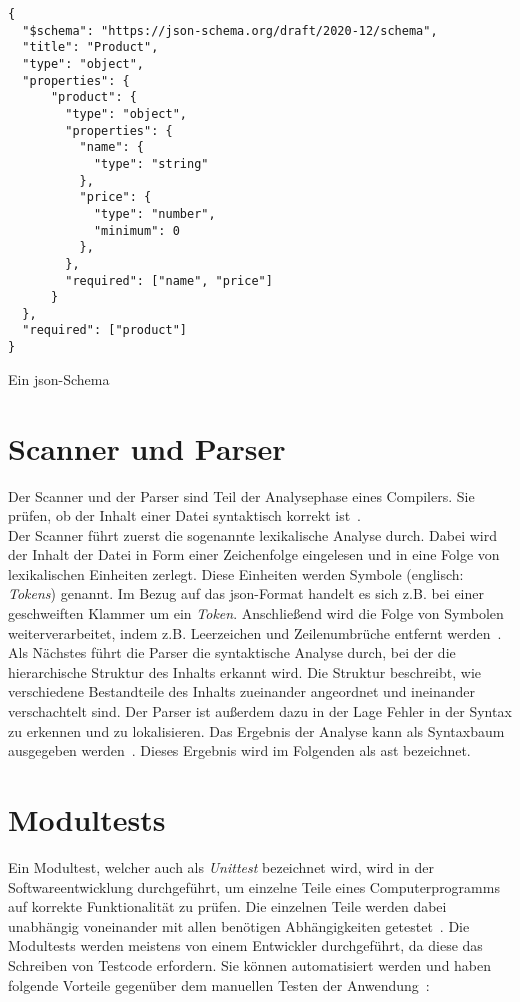 \begin{listing}[htp]
    \begin{verbatim}
{
  "$schema": "https://json-schema.org/draft/2020-12/schema",
  "title": "Product",
  "type": "object",
  "properties": {
      "product": {
        "type": "object",
        "properties": {
          "name": {
            "type": "string"
          },
          "price": {
            "type": "number", 
            "minimum": 0
          },
        },
        "required": ["name", "price"]
      }
  },
  "required": ["product"]
}
      \end{verbatim}
    \caption{Ein \acs{json}-Schema}
    \label{lst:json-schema}
\end{listing}

\section{Scanner und Parser}\label{sec:parser}

Der Scanner und der Parser sind Teil der Analysephase eines Compilers. Sie prüfen, ob der Inhalt einer Datei syntaktisch korrekt ist~\cite{SommerGumm+2019+113+148}.
\\
Der Scanner führt zuerst die sogenannte lexikalische Analyse durch. Dabei wird der Inhalt der Datei in Form einer
Zeichenfolge eingelesen und in eine Folge von lexikalischen Einheiten zerlegt.
Diese Einheiten werden Symbole (englisch: \textit{Tokens}) genannt.
Im Bezug auf das \ac{json}-Format handelt es sich z.B. bei einer geschweiften Klammer um ein \textit{Token}.
Anschließend wird die Folge von Symbolen weiterverarbeitet, indem z.B. Leerzeichen und Zeilenumbrüche entfernt werden~\cite{syntax-analysis}.
\\
Als Nächstes führt die Parser die syntaktische Analyse durch, bei der die hierarchische Struktur des Inhalts erkannt wird.
Die Struktur beschreibt, wie verschiedene Bestandteile des Inhalts zueinander angeordnet und ineinander verschachtelt sind.
Der Parser ist außerdem dazu in der Lage Fehler in der Syntax zu erkennen und zu lokalisieren.
Das Ergebnis der Analyse kann als Syntaxbaum ausgegeben werden~\cite{syntax-analysis}.
Dieses Ergebnis wird im Folgenden als \ac{ast} bezeichnet.

\section{Modultests}\label{sec:unit-tests}

Ein Modultest, welcher auch als \textit{Unittest} bezeichnet wird, wird in der Softwareentwicklung durchgeführt,
um einzelne Teile eines Computerprogramms auf korrekte Funktionalität zu prüfen. Die einzelnen Teile
werden dabei unabhängig voneinander mit allen benötigen Abhängigkeiten getestet~\cite{Witte2019}.
Die Modultests werden meistens von einem Entwickler durchgeführt, da diese das Schreiben von Testcode erfordern.
Sie können automatisiert werden und haben folgende Vorteile gegenüber dem manuellen Testen der Anwendung~\cite{unit-tests-in-python}:

